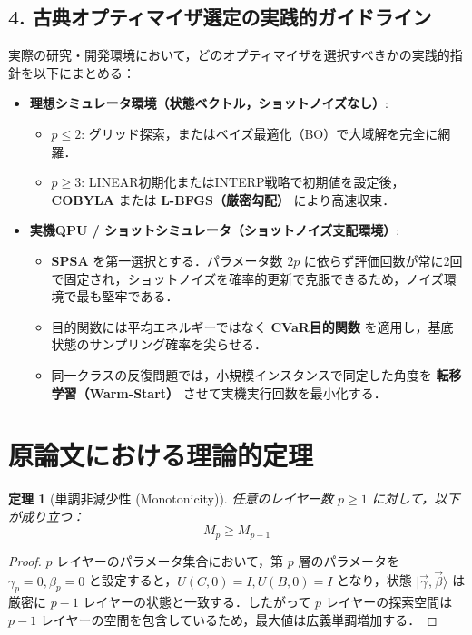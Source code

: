 \documentclass[11pt,a4paper,oneside,openany]{ltjsbook}
\theoremstyle{definition}
\theoremstyle{plain}
\newtheorem{theorem}{定理}[chapter]
\theoremstyle{remark}
\newcommand{\ket}[1]{|#1\rangle}
\begin{document}
\subsection{4. 古典オプティマイザ選定の実践的ガイドライン}
実際の研究・開発環境において，どのオプティマイザを選択すべきかの実践的指針を以下にまとめる：
\begin{itemize}
    \item \textbf{理想シミュレータ環境（状態ベクトル，ショットノイズなし）}:
          \begin{itemize}
              \item $p \le 2$: グリッド探索，またはベイズ最適化（BO）で大域解を完全に網羅．
              \item $p \ge 3$: LINEAR初期化またはINTERP戦略で初期値を設定後，\textbf{COBYLA} または \textbf{L-BFGS（厳密勾配）} により高速収束．
          \end{itemize}
    \item \textbf{実機QPU / ショットシミュレータ（ショットノイズ支配環境）}:
          \begin{itemize}
              \item \textbf{SPSA} を第一選択とする．パラメータ数 $2p$ に依らず評価回数が常に2回で固定され，ショットノイズを確率的更新で克服できるため，ノイズ環境で最も堅牢である．
              \item 目的関数には平均エネルギーではなく \textbf{CVaR目的関数} を適用し，基底状態のサンプリング確率を尖らせる．
              \item 同一クラスの反復問題では，小規模インスタンスで同定した角度を \textbf{転移学習（Warm-Start）} させて実機実行回数を最小化する．
          \end{itemize}
\end{itemize}

\section{原論文における理論的定理}

\begin{theorem}[単調非減少性 (Monotonicity)]
任意のレイヤー数 $p \ge 1$ に対して，以下が成り立つ：
\begin{equation}
    M_p \ge M_{p-1}
\end{equation}
\end{theorem}
\begin{proof}
$p$ レイヤーのパラメータ集合において，第 $p$ 層のパラメータを $\gamma_p = 0, \beta_p = 0$ と設定すると，$U(C, 0) = I, U(B, 0) = I$ となり，状態 $\ket{\vec{\gamma}, \vec{\beta}}$ は厳密に $p-1$ レイヤーの状態と一致する．したがって $p$ レイヤーの探索空間は $p-1$ レイヤーの空間を包含しているため，最大値は広義単調増加する．
\end{proof}
\end{document}
